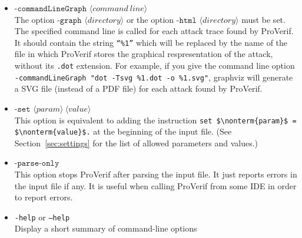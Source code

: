 \documentclass{book}
\newcommand{\nonterm}[1]{\langle\mathit{#1}\rangle}
\begin{document}
\begin{itemize}
  ProVerif includes a CSS file \texttt{cssproverif.css} in the main
  directory of the distribution. You should copy that file to
  $\nonterm{directory}$. You may edit it to suit your preferences if you
  wish.

  After running ProVerif, you should open the file
  $\nonterm{directory}\texttt{/index.html}$ with your favorite web browser to
  display the results.

  If graphviz is installed and you did not specify a command line with the option
  \texttt{-commandLineGraph}, then drawings of the traces are available by clicking on
  \texttt{graph trace}. Two versions of the drawings are available: a standard and a detailed
  version. The detailed version is built when \lstinline!set traceDisplay = long.!
  has been added to the input file.

\item $\texttt{-commandLineGraph }\nonterm{command\ line}$ \\
  The option $\texttt{-graph }\nonterm{directory}$
  or the option $\texttt{-html }\nonterm{directory}$ must be set.
  The specified command line is called for each attack trace found by ProVerif.
  It should contain the string \texttt{``\%1''} which will be replaced by
  the name of the file in which ProVerif stores the graphical respresentation of the attack,
  without its \texttt{.dot} extension.
  For example, if you give the command line option
  \texttt{-commandLineGraph "dot -Tsvg \%1.dot -o \%1.svg"}, graphviz will generate a SVG file
  (instead of a PDF file) for each attack found by ProVerif.


\item $\texttt{-set }\nonterm{param}\ \nonterm{value}$\\
  This option is equivalent to adding the instruction
  \lstinline!set $\nonterm{param}$ = $\nonterm{value}$.!
  at the beginning of the input file. (See Section~\ref{sec:settings} for
  the list of allowed parameters and values.)

\item $\texttt{-parse-only}$\\
  This option stops ProVerif after parsing the input file. It just reports errors in the input file if any. It is useful when calling ProVerif from some IDE in order to report errors.

\item \texttt{-help} or \texttt{--help} \\
Display a short summary of command-line options
\end{itemize}
\end{document}
